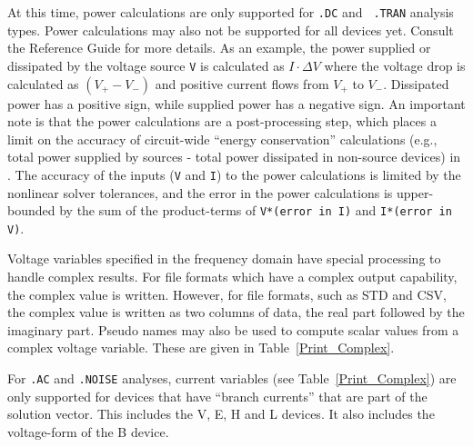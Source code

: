 At this time, power calculations are only supported for {\tt .DC} and {\tt 
.TRAN} analysis types.  Power calculations may also not be supported for all \Xyce{}
devices yet.  Consult the \Xyce{} Reference Guide\ReferenceGuide{} for more details.
As an example, the power supplied or dissipated by the 
voltage source {\tt V} is calculated as $I \cdot \Delta V$ where the voltage drop is 
calculated as $(V_+ - V_-)$  and positive current flows from $V_+$ to $V_-$.  Dissipated power 
has a positive sign, while supplied power has a negative sign.  An important note is that
the power calculations are a post-processing step, which places a limit on the accuracy 
of circuit-wide ``energy conservation'' calculations (e.g., total power supplied by sources 
- total power dissipated in non-source devices) in \Xyce{}.  The accuracy of the inputs ({\tt V} and 
{\tt I}) to the power calculations is limited by the nonlinear solver tolerances, and the error
in the power calculations is upper-bounded by the sum of the product-terms of 
{\tt V*(error in I)} and {\tt I*(error in V)}.

Voltage variables specified in the frequency domain have special processing to
handle complex results.  For file formats which have a complex output
capability, the complex value is written.  However, for file formats, such as
STD and CSV, the complex value is written as two columns of data, the real part
followed by the imaginary part. Pseudo names may also be used to compute scalar
values from a complex voltage variable. These are given in
Table~\ref{Print_Complex}.

For {\tt .AC} and {\tt .NOISE} analyses, current variables (see Table~\ref{Print_Complex})
are only supported for devices that have ``branch currents'' that are part of the solution
vector.  This includes the V, E, H and L devices.  It also includes the voltage-form
of the B device.

